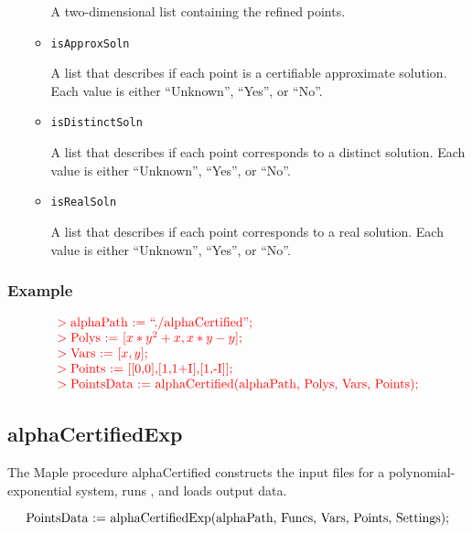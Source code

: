 \documentclass[11pt]{report}
\begin{document}
\begin{itemize}
\begin{itemize}
A two-dimensional list containing the refined points.

 \item {\tt isApproxSoln}

A list that describes if each point is a certifiable approximate solution.
Each value is either ``Unknown'', ``Yes'', or ``No''.

 \item {\tt isDistinctSoln}

A list that describes if each point corresponds to a distinct solution.
Each value is either ``Unknown'', ``Yes'', or ``No''.

 \item {\tt isRealSoln}

A list that describes if each point corresponds to a real solution.
Each value is either ``Unknown'', ``Yes'', or ``No''.

\end{itemize}
\end{itemize}

\subsubsection{Example}

\[
\begin{color}{red}\begin{array}{l}
> \hbox{alphaPath := ``./alphaCertified'';} \\
> \hbox{Polys := [$x*y^2 + x, x*y - y$];} \\
> \hbox{Vars := [$x,y$];} \\
> \hbox{Points := [[0,0],[1,1+I],[1,-I]];} \\
> \hbox{PointsData := alphaCertified(alphaPath, Polys, Vars, Points);}
\end{array}\end{color}
\]

\subsection{alphaCertifiedExp}\label{Sec:alphaExpM}

The Maple procedure alphaCertified constructs the input files
for a polynomial-exponential system, runs \blueharvest, and loads output data.

\[
\hbox{PointsData := alphaCertifiedExp(alphaPath, Funcs, Vars, Points, Settings);}
\]
\end{document}
